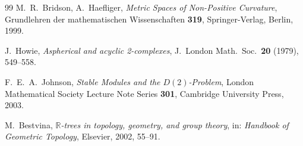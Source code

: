 \documentclass[12pt,a4paper]{amsart}
\theoremstyle{definition}
\theoremstyle{remark}
\begin{document}
\begin{thebibliography}{99}
M.~R.~Bridson, A.~Haefliger,
\textit{Metric Spaces of Non-Positive Curvature},
Grundlehren der mathematischen Wissenschaften \textbf{319},
Springer-Verlag, Berlin, 1999.

J.~Howie,
\textit{Aspherical and acyclic 2-complexes},
J.\ London Math.\ Soc.\ \textbf{20} (1979), 549--558.

F.~E.~A.~Johnson,
\textit{Stable Modules and the $D(2)$-Problem},
London Mathematical Society Lecture Note Series \textbf{301},
Cambridge University Press, 2003.

M.~Bestvina,
\textit{$\mathbb{R}$-trees in topology, geometry, and group theory},
in: \textit{Handbook of Geometric Topology}, Elsevier, 2002, 55--91.

\end{thebibliography}
\end{document}
